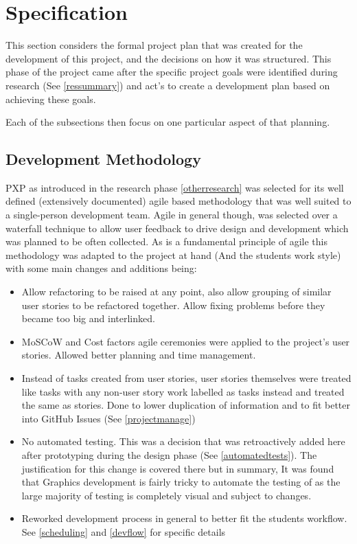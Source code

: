 \section{Specification}
This section considers the formal project plan that was created for the development of this project, and the decisions on how it was structured. This phase of the project came after the specific project goals were identified during research (See \ref{ressummary}) and act's to create a development plan based on achieving these goals.

Each of the subsections then focus on one particular aspect of that planning.

\subsection{Development Methodology} \label{devmet}
PXP as introduced in the research phase \ref{otherresearch} was selected for its well defined (extensively documented) agile based methodology that was well suited to a single-person development team. Agile in general though, was selected over a waterfall technique to allow user feedback to drive design and development which was planned to be often collected.
As is a fundamental principle of agile this methodology was adapted to the project at hand (And the students work style) with some main changes and additions being:
\begin{itemize}
    \item Allow refactoring to be raised at any point, also allow grouping of similar user stories to be refactored together. Allow fixing problems before they became too big and interlinked.
    \item MoSCoW and Cost factors agile ceremonies were applied to the project’s user stories. Allowed better planning and time management.
    \item Instead of tasks created from user stories, user stories themselves were treated like tasks with any non-user story work labelled as tasks instead and treated the same as stories. Done to lower duplication of information and to fit better into GitHub Issues (See \ref{projectmanage})
    \item No automated testing. This was a decision that was retroactively added here after prototyping during the design phase (See \ref{automatedtests}). The justification for this change is covered there but in summary, It was found that Graphics development is fairly tricky to automate the testing of as the large majority of testing is completely visual and subject to changes.
    \item Reworked development process in general to better fit the students workflow. See \ref{scheduling} and \ref{devflow} for specific details
\end{itemize}

